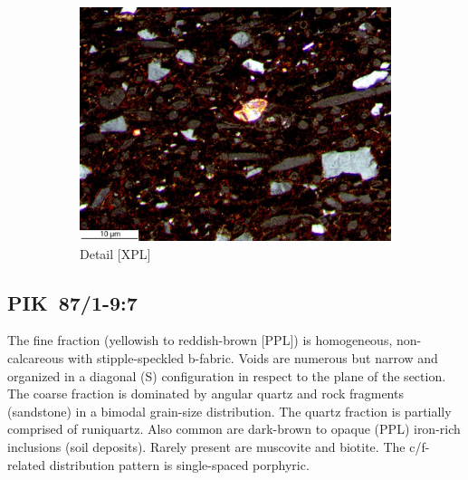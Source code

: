 \documentclass[a4paper]{article}
\begin{document}
\begin{figure}[H]
\begin{subfigure}[t]{.32\textwidth}
		\includegraphics[width=\textwidth]{ThinSections/54-3_20x_XPL.jpg}
		\caption{Detail [XPL]}
	\end{subfigure}
	\caption{}
	\label{fig:54_pik}
\end{figure}

\newpage\subsection{PIK~87/1-9:7 \citep[pik\#6; Fig.~\ref{fig:pik.pottery}.8; cf. Ngbanja style;][428 Pl.~47.19]{Seidensticker.2021e}}

\begin{multicols}{2}
\noindent The fine fraction (yellowish to reddish-brown [PPL]) is homogeneous, non-calcareous with stipple-speckled b-fabric. Voids are numerous but narrow and organized in a diagonal (S) configuration in respect to the plane of the section. The coarse fraction is dominated by angular quartz and rock fragments (sandstone) in a bimodal grain-size distribution. The quartz fraction is partially comprised of runiquartz. Also common are dark-brown to opaque (PPL) iron-rich inclusions (soil deposits). Rarely present are muscovite and biotite. The c/f-related distribution pattern is single-spaced porphyric.
\end{multicols}

\end{document}
